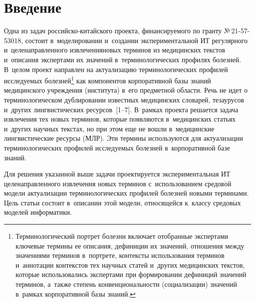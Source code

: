 
  



\thispagestyle{headings}

\begin{multicols}{2}

\label{st\stat}

\section{Введение}

  Одна из задач российско-ки\-тай\-ско\-го проекта, финансируемого по 
гранту №\,21-57-53018, состоит в~моделировании и~создании 
экспериментальной ИТ регулярного 
и~целенаправленного извлечения\linebreak новых терминов из медицинских текстов 
и~описания экспертами их значений в~терминологических профилях 
болезней. В~целом проект направлен на актуализацию терминологических 
\mbox{профилей} исследуемых болезней\footnote[5]{Терминологический портрет болезни 
включает отобранные экспертами ключевые термины ее описания, дефиниции их значений, 
отношения между значениями терминов в~портрете, контексты использования терминов 
и~аннотации контекстов тех научных статей и~других медицинских текстов, которые 
использовались экспертами при формировании дефиниций значений терминов, а~также степень 
конвенциональности (социализации) значений в~рамках корпоративной базы знаний.} как 
компонентов корпоративной базы знаний медицинского учреждения 
(института) в~его предметной об\-ласти. Речь не идет о терминологическом 
дублировании известных \mbox{медицинских} словарей, тезаурусов и~других 
лингвистических ресурсов~[1--7]. В~рамках проекта решается задача 
извлечения тех новых терминов, которые появляются в~медицинских статьях и~других научных текстах, но при этом еще не вошли в~медицинские 
лингвистические ресурсы (МЛР). Эти термины используются для актуализации 
терминологических профилей исследуемых болезней в~корпоративной базе 
знаний.
  
  Для решения указанной выше задачи проектируется экспериментальная 
ИТ целенаправленного извлечения новых терминов с~использованием 
средов$\acute{\mbox{о}}$й модели актуализации \mbox{терминологических} 
профилей болезней новыми терминами. Цель \mbox{статьи} состоит в~описании этой 
модели, относящейся к~классу средов$\acute{\mbox{ы}}$х моделей 
информатики.


\end{multicols}
